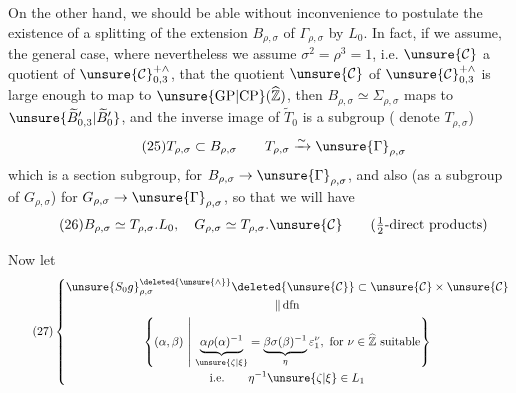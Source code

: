On the other hand, we should be able without inconvenience to postulate the existence of a  splitting of the extension $B_{\rho,\sigma}$ of $\Gamma_{\rho,\sigma}$ by $L_0$.
In fact, if we assume,  
 the general case, where nevertheless we assume $\sigma^2=\rho^3=1$, i.e. $\unsure{\mathcal{C}}$ a quotient of $\unsure{\mathcal{C}}_{0,3}^{+\wedge}$, that the quotient $\unsure{\mathcal{C}}$ of $\unsure{\mathcal{C}}_{0,3}^{+\wedge}$ is large enough to map to $\unsure{\mathrm{GP}|\mathrm{CP}}(\widehat{\mathbb{Z}})$, then  $B_{\rho,\sigma}\simeq\Sigma_{\rho,\sigma}$ maps to $\unsure{\widetilde{B}'_{0,3}|\widetilde{B}'_{0}}$, and the inverse image of $\widetilde{T}_0$ is a subgroup ( denote $T_{\rho,\sigma}$)
\[
\tag{25}
T_{\rho,\sigma}\subset B_{\rho,\sigma}\qquad
T_{\rho,\sigma}\xrightarrow{\sim}\unsure{\Gamma}_{\rho,\sigma}
\]
which is a section subgroup, for $B_{\rho,\sigma}\to\unsure{\Gamma}_{\rho,\sigma}$, and also (as a subgroup of $G_{\rho,\sigma}$) for $G_{\rho,\sigma}\to\unsure{\Gamma}_{\rho,\sigma}$, so that we will have
\[
\tag{26}
B_{\rho,\sigma}\simeq T_{\rho,\sigma}.L_0,\quad
G_{\rho,\sigma}\simeq T_{\rho,\sigma}.\unsure{\mathcal{C}}
\qquad\text{($\tfrac12$-direct products)}
\]


Now let
\[
\tag{27}
\left\{
\begin{gathered}
\unsure{S_0g}_{\rho,\sigma}^{\deleted{\unsure{\wedge}}}
\deleted{\unsure{\mathcal{C}}}\subset
\unsure{\mathcal{C}}\times\unsure{\mathcal{C}}
\\[-0.3ex]
\Vert\,\mathrm{dfn}
\\
\left\{(\alpha,\beta)\ \middle|\
\underbrace{\alpha\rho(\alpha)^{-1}}_{\unsure{\zeta|\xi}}
=\underbrace{\beta\sigma(\beta)^{-1}}_{\eta}\varepsilon_1^\nu,
\ \text{for }\nu\in\widehat{\mathbb{Z}}\ \text{suitable}\right\}
\\[-0.3ex]
\text{i.e.}\qquad \eta^{-1}\unsure{\zeta|\xi}\in L_1
\end{gathered}
\right.
\]

